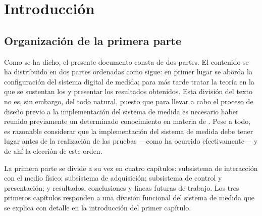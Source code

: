 \chapter*{Introducción}

\section*{Organización de la primera parte}

Como se ha dicho, el presente documento consta de dos partes. El contenido
se ha distribuido en dos partes ordenadas como sigue: en primer lugar se
aborda la configuración del sistema digital de medida; para más tarde
tratar la teoría en la que se sustentan los  y presentar los
resultados obtenidos. Esta división del texto no es, sin embargo, del todo
natural, puesto que para llevar a cabo el proceso de diseño previo a la
implementación del sistema de medida es necesario haber reunido previamente
un determinado conocimiento en materia de . Pese a todo, es
razonable considerar que la implementación del sistema de medida debe tener
lugar antes de la realización de las pruebas ---como ha ocurrido
efectivamente--- y de ahí la elección de este orden.

La primera parte se divide a su vez en cuatro capítulos: subsistema de
interacción con el medio físico; subsistema de adquisición; subsistema de
control y presentación; y resultados, conclusiones y líneas futuras de
trabajo. Los tres primeros capítulos responden a una división funcional del
sistema de medida que se explica con detalle en la introducción del primer
capítulo.


